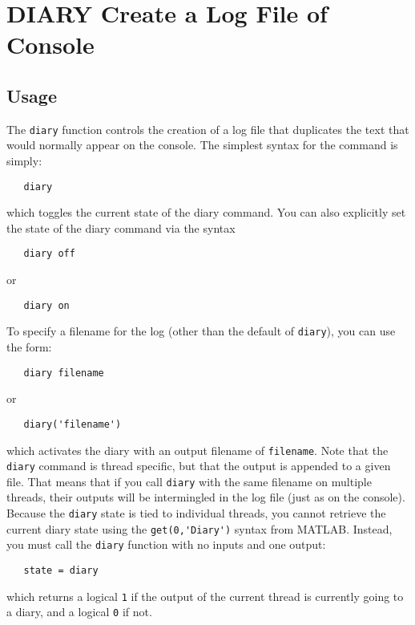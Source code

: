 \section{DIARY Create a Log File of Console}

\subsection{Usage}

The \verb|diary| function controls the creation of a log file that duplicates
the text that would normally appear on the console.
The simplest syntax for the command is simply:
\begin{verbatim}
   diary
\end{verbatim}
which toggles the current state of the diary command.  You can also explicitly
set the state of the diary command via the syntax
\begin{verbatim}
   diary off
\end{verbatim}
or
\begin{verbatim}
   diary on
\end{verbatim}
To specify a filename for the log (other than the default of \verb|diary|), you 
can use the form:
\begin{verbatim}
   diary filename
\end{verbatim}
or
\begin{verbatim}
   diary('filename')
\end{verbatim}
which activates the diary with an output filename of \verb|filename|.  Note that the
\verb|diary| command is thread specific, but that the output is appended to a given
file.  That means that if you call \verb|diary| with the same filename on multiple 
threads, their outputs will be intermingled in the log file (just as on the console).
Because the \verb|diary| state is tied to individual threads, you cannot retrieve the
current diary state using the \verb|get(0,'Diary')| syntax from MATLAB.  Instead, you
must call the \verb|diary| function with no inputs and one output:
\begin{verbatim}
   state = diary
\end{verbatim}
which returns a logical \verb|1| if the output of the current thread is currently going to
a diary, and a logical \verb|0| if not.
